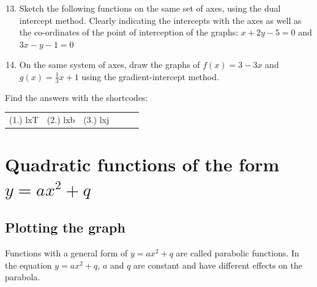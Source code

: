 \begin{exercises}{}
{\begin{figure}[H]
\end{figure}  
            
\begin{enumerate}[noitemsep, label=\textbf{\arabic*}. ] 
\setcounter{enumi}{12}
\item Sketch the following functions on the same set of axes, using the dual intercept method. Clearly indicating the intercepts with the axes as well as the co-ordinates of the point of interception of the graphs: $x+2y-5=0$ and $3x-y-1=0$
\item On the same system of axes, draw the graphs of $f(x)=3-3x$ and $g(x)=\frac{1}{3}x+1$ using the gradient-intercept method.
\end{enumerate}

\par {} Find the answers with the shortcodes:
\par \begin{tabular}[h]{cccccc}
(1.) lxT  &  (2.) lxb  &  (3.) lxj  & \end{tabular}
}
\end{exercises}
   

\section{Quadratic functions of the form $y=a{x}^{2}+q$}
\subsection*{Plotting the graph}         
Functions with a general form of $y=a{x}^{2}+q$ are called parabolic functions. In the equation $y=a{x}^{2}+q$, $a$ and $q$ are constant and have different effects on the parabola. 

